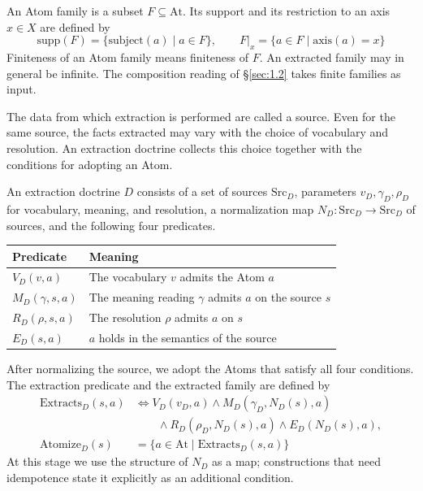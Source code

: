 \begin{definition}\label{def:1.2}

An Atom family is a subset $F\subseteq\mathrm{At}$. Its support and its
restriction to an axis $x\in X$ are defined by
\[
\mathrm{supp}(F)=\{\mathrm{subject}(a)\mid a\in F\},
\qquad
F|_x=\{a\in F\mid \mathrm{axis}(a)=x\}
\]
Finiteness of an Atom family means finiteness of $F$.
An extracted family may in general be infinite. The composition reading of
\S\ref{sec:1.2} takes finite families as input.

The data from which extraction is performed are called a source. Even for the same
source, the facts extracted may vary with the choice of vocabulary and resolution.
An extraction doctrine collects this choice together with the conditions for
adopting an Atom.

\end{definition}

\begin{definition}\label{def:1.3}

An extraction doctrine $D$ consists of a set of sources $\mathrm{Src}_D$,
parameters $v_D,\gamma_D,\rho_D$ for vocabulary, meaning, and resolution, a
normalization map $N_D:\mathrm{Src}_D\to\mathrm{Src}_D$ of sources, and the
following four predicates.

\begin{xltabular}{\linewidth}{@{}LL@{}}
\toprule
Predicate & Meaning \\
\midrule
\endhead
$V_D(v,a)$ & The vocabulary $v$ admits the Atom $a$ \\
\addlinespace[3pt]
$M_D(\gamma,s,a)$ & The meaning reading $\gamma$ admits $a$ on the source $s$ \\
\addlinespace[3pt]
$R_D(\rho,s,a)$ & The resolution $\rho$ admits $a$ on $s$ \\
\addlinespace[3pt]
$E_D(s,a)$ & $a$ holds in the semantics of the source \\
\bottomrule
\end{xltabular}

After normalizing the source, we adopt the Atoms that satisfy all four conditions.
The extraction predicate and the extracted family are defined by
\[
\begin{aligned}
\mathrm{Extracts}_D(s,a)
&\Longleftrightarrow
V_D(v_D,a)\land M_D(\gamma_D,N_D(s),a)\\
&\hspace{2em}\land R_D(\rho_D,N_D(s),a)\land E_D(N_D(s),a),\\
\mathrm{Atomize}_D(s)
&=\{a\in\mathrm{At}\mid \mathrm{Extracts}_D(s,a)\}
\end{aligned}
\]
At this stage we use the structure of $N_D$ as a map; constructions that need
idempotence state it explicitly as an additional condition.

\end{definition}

